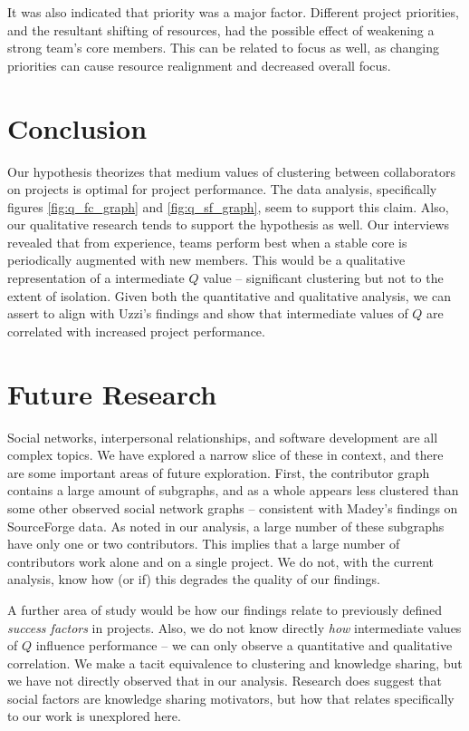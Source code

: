 \documentclass{proc}
\begin{document}
It was also indicated that priority was a major factor. Different project priorities, and the resultant shifting of resources, had the possible effect of weakening a strong team's core members. This can be related to focus as well, as changing priorities can cause resource realignment and decreased overall focus.

\section{Conclusion}
Our hypothesis theorizes that medium values of clustering between collaborators on projects is optimal for project performance. The data analysis, specifically figures \ref{fig:q_fc_graph} and \ref{fig:q_sf_graph}, seem to support this claim. Also, our qualitative research tends to support the hypothesis as well. Our interviews revealed that from experience, teams perform best when a stable core is periodically augmented with new members. This would be a qualitative representation of a intermediate $Q$ value -- significant clustering but not to the extent of isolation. Given both the quantitative and qualitative analysis, we can assert to align with Uzzi's findings\cite{uzzi2005collaboration} and show that intermediate values of $Q$ are correlated with increased project performance.

\section{Future Research}
Social networks, interpersonal relationships, and software development are all complex topics. We have explored a narrow slice of these in context, and there are some important areas of future exploration. First, the contributor graph contains a large amount of subgraphs, and as a whole appears less clustered than some other observed social network graphs -- consistent with Madey's findings\cite{madey2002open} on SourceForge data. As noted in our analysis, a large number of these subgraphs have only one or two contributors. This implies that a large number of contributors work alone and on a single project. We do not, with the current analysis, know how (or if) this degrades the quality of our findings.

A further area of study would be how our findings relate to previously defined \textit{success factors} in projects\cite{cooke2002real}. Also, we do not know directly \textit{how} intermediate values of $Q$ influence performance -- we can only observe a quantitative and qualitative correlation. We make a tacit equivalence to clustering and knowledge sharing, but we have not directly observed that in our analysis. Research does suggest that social factors are knowledge sharing motivators\cite{hendriks1999share}, but how that relates specifically to our work is unexplored here.
\end{document}

